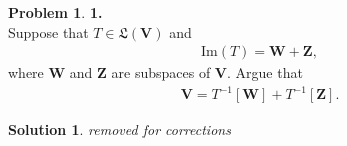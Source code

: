 \documentclass{book}
\theoremstyle{definition}
\newtheorem*{prob*}{Problem}
\newtheorem*{sln*}{Solution}
\newcommand{\V}{\mathbf{V}}
\newcommand{\W}{\mathbf{W}}
\newcommand{\Z}{\mathbf{Z}}
\newcommand{\ima}{\text{Im}}
\begin{document}
\begin{prob*}\textbf{1.} \\
	
	Suppose that $T \in \mathfrak{L}(\V)$ and
	\begin{align*}
	\ima(T)= \W + \Z,
	\end{align*}
	where $\W$ and $\Z$ are subspaces of $\V$. Argue that
	\begin{align*}
	\V = T^{-1}[\W] + T^{-1}[\Z].
	\end{align*}
	
	\begin{sln*}
		\textit{removed for corrections}
	\end{sln*}
	
%		
\end{prob*}


\newpage
\end{document}
